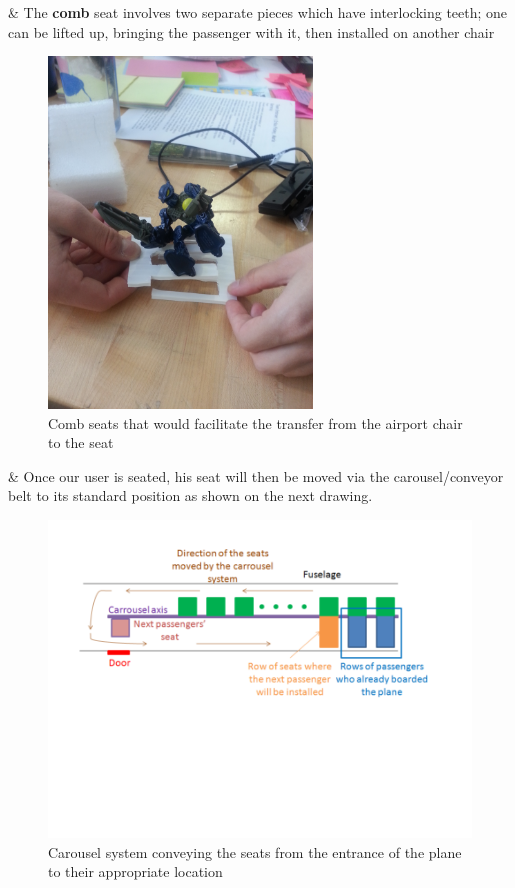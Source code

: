 \begin{easylist}[itemize]
\begin{easylist}[itemize]
	& The \textbf{comb} seat involves two separate pieces which have interlocking teeth; one can be lifted up, bringing the passenger with it, then installed on another chair
\begin{figure}[h]
  \centering
     \includegraphics[width=7cm]{images/20140120_121849.jpg}
   \caption{Comb seats that would facilitate the transfer from the airport chair to the seat}
  \label{fig:20140120_121849}
\end{figure} 

\end{easylist}

& Once our user is seated, his seat will then be moved via the carousel/conveyor belt to its standard position as shown on the next drawing.

\begin{figure}[h]
  \centering
     \includegraphics[width=12cm]{images/carousel_for_the_dummies.png}
   \caption{Carousel system conveying the seats from the entrance of the plane to their appropriate location}
  \label{fig:Carousel_system}
\end{figure} 
\end{easylist}

